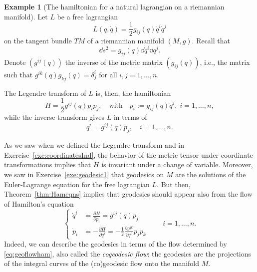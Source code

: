 \documentclass[english,fontsize=11pt,paper=b5]{scrbook}
\numberwithin{equation}{chapter}
\theoremstyle{definition}
\newtheorem{example}{Example}[chapter]
\begin{document}
    \begin{example}[The hamiltonian for a natural lagrangian on a riemannian manifold]\label{ex:nlrm}
      Let $L$ be a free lagrangian
      \begin{equation}
        L(q, \dot q) = \frac12 g_{ij}(q) \dot q^i \dot q^j
      \end{equation}
      on the tangent bundle $TM$ of a riemannian manifold $(M,g)$.
      Recall that
      \begin{equation}
        \dd s^2 = g_{ij}(q)\dd q^i \dd q^j.
      \end{equation}
      Denote $(g^{ij}(q))$ the inverse of the metric matrix $(g_{ij}(q))$, i.e., the matrix such that $g^{ik}(q)g_{kj}(q) = \delta^i_j$ for all $i,j=1,\ldots,n$.

      The Legendre transform of $L$ is, then, the hamiltonian
      \begin{equation}
        H = \frac12 g^{ij}(q) p_i p_j,\quad\mbox{with}\quad
        p_i := g_{ij}(q)\dot q^j, \; i = 1,\ldots, n,
      \end{equation}
      while the inverse transform gives $L$ in terms of
      \begin{equation}
        \dot q^i = g^{ij}(q) p_j, \quad i = 1,\ldots, n.
      \end{equation}

      As we saw when we defined the Legendre transform and in Exercise~\ref{exe:coordinatesInd}, the behavior of the metric tensor under coordinate transformations implies that $H$ is invariant under a change of variable.
      Moreover, we saw in Exercise~\ref{exe:geodesic1} that geodesics on $M$ are the solutions of the Euler-Lagrange equation for the free lagrangian $L$.
      But then, Theorem~\ref{thm:Hameqns} implies that geodesics should appear also from the flow of Hamilton's equation
      \begin{equation}\label{eq:geoflowham}
        \left\lbrace
          \begin{aligned}
            \dot q^i & = \frac{\partial H}{\partial p_i} = g^{ij}(q) p_j                                          \\
            \dot p_i & = -\frac{\partial H}{\partial q^i} = -\frac12 \frac{\partial g^{jk}}{\partial q^i} p_j p_k
          \end{aligned}
        \right.
        \qquad i=1,\ldots,n.
      \end{equation}
      Indeed, we can describe the geodesics in terms of the flow determined by \eqref{eq:geoflowham}, also called the \emph{cogeodesic flow}:
      the geodesics are the projections of the integral curves of the (co)geodesic flow onto the manifold $M$.


\end{example}
\end{document}
